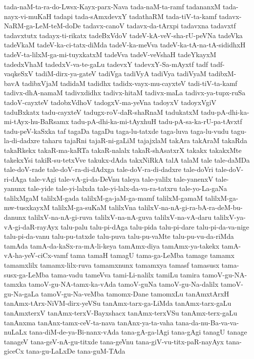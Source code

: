 {tada-naM-ta-ra-do-Lwsx-Kayx-parx-Nava
tada-naM-ta-ramf
tadananxM
tada-nayx-vi-muKaH
tadapi
tada-sAmxdevxY
tadathaRM
tada-tiV-ta-kamf
tadavx-NaRM-ga-LeM-teM-doDe
tadavx-canoV
tadavx-da-tArxpi
tadavxna
tadavxtf
tadavxtutx
tadayx-ti-rikatx
tadeBxVdoV
tadeV-kA-veV-sha-rU-peVNa
tadeVka
tadeVkaM
tadeV-ka-ci-tatx-diMda
tadeV-ka-meVva
tadeV-ka-tA-na-tA-sididhxH
tadeV-ta-lilxM-ga-mi-tuyxkatxM
tadeVva
tadeV-veVshaH
tadeYkayxM
tadedxVhaM
tadedxV-va-te-gaLu
tadevxY
tadevxY-Sa-mAyxtf
tadf
tadf-vaqkeSxV
tadiM-dirx-ya-gateV
tadiVga
tadiVyA
tadiVya
tadiVyaM
tadibxM-bavA
tadibxVjaM
tadidaM
tadidhx
tadidx-vayx-mu-cayxteV
tadi-tiV-ta-kamf
tadivx-dhA-namaM
tadivxdidhx
tadivx-hitaM
tadivx-maLa
tadivx-ya-tupx-ruSa
tadoV-cayxteV
tadobxVdhoV
tadogxV-ma-yeVna
tadoyxV
tadoyxVgiV
taduBxkatx
tadu-cayxteV
tadugx-roV-daR-shaRnaM
tadukatxM
tadu-pA-dhi-ka-mi-tAyx-hu-BaRsamx
tadu-pA-dhi-ka-mi-tAyxhuH
tadu-pA-sa-ka-rU-pa-tAvxtf
tadu-peV-kaSxka
taf
tagaDa
tagaDu
taga-lu-tatxde
taga-luva
taga-lu-vudu
tagu-la-di-dadxre
taharu
tajaRni
tajaR-ni-gaLiM
tajajxlaM
takAra
takAraM
takaRda
takaRkekx
takaR-ma-kaRTa
takaR-nalalx
takaR-shAsatxrX
takakx
takakxMte
takekxYsi
takiR-su-tetxVve
takukx-dAda
takxNiRkA
talA
talaM
tale
tale-daMDa
tale-doV-rade
tale-doV-ra-di-dAdxga
tale-doV-ra-di-dadxre
tale-doVri
tale-doV-ri-dAga
tale-vAgi
tale-vA-gi-da-DeVnu
taleya
tale-yalilx
tale-yanenxV
tale-yanunx
tale-yide
tale-yi-lalxda
tale-yi-lalx-da-va-ra-tatxru
tale-yo-La-gaNa
talilxMgaM
talilxM-gada
talilxM-ga-jaM-ga-mamf
talilxM-gamaM
talilxM-ga-mw-tusxkayxM
talilxM-ga-suKaM
talilxVna
talilxV-na-nA-gi-ra-bA-ra-deM-bu-danunx
talilxV-na-nA-gi-ruva
talilxV-na-nA-guva
talilxV-na-vA-daru
talilxV-ya-vA-gi-daR-rayAyx
talu-palu
talu-pi-dAga
talu-pida
talu-pi-dare
talu-pi-da-va-nige
talu-pi-da-vanu
talu-pu-tatxde
talu-puva
talu-pu-vaMte
talu-pu-vu-da-riMda
tamAda
tamA-da-kaSx-ra-mA-li-keya
tamAmx-diya
tamAmx-ya-takekx
tamA-vA-ha-yeV-ciCx-vamf
tama
tamaH
tamagU
tama-ga-LeMba
tamage
tamamx
tamamxlilx
tamamx-lilx-ruva
tamamxnunx
tamamxya
tamasf
tamasusx
tama-susx-ga-LeMba
tama-vadu
tameVva
tami-Li-nalilx
tamiLu
tamira
tamoV-gu-NA-tamxka
tamoV-gu-NA-tamx-ka-vAda
tamoV-guNa
tamoV-gu-Na-dalilx
tamoV-gu-Na-gaLa
tamoV-gu-Na-veMba
tamomx-Dane
tamomxLu
tanAmxtArxH
tanAmx-tArx-NiVM-dirx-yeVSu
tanAmx-tarx-ga-LiMda
tanAmx-tarx-gaLu
tanAmxterxV
tanAmx-terxV-Bayxshacx
tanAmx-terxVSu
tanAmx-terx-gaLu
tanAnxma
tanAnx-tamx-ceV-ta-nava
tanAnx-ya-ta-vaha
tana-da-nu-Ba-va-va-nuLaLx
tana-diM-de-ya-Bi-nanx-vAda
tana-gA-ga-lAgi
tana-gAgi
tanagU
tanage
tanageV
tana-geV-nA-gu-titxde
tana-geVnu
tana-giV-vu-titx-paR-nayAyx
tana-giceCx
tana-gu-LaLxDe
tana-guM-TAda
}
